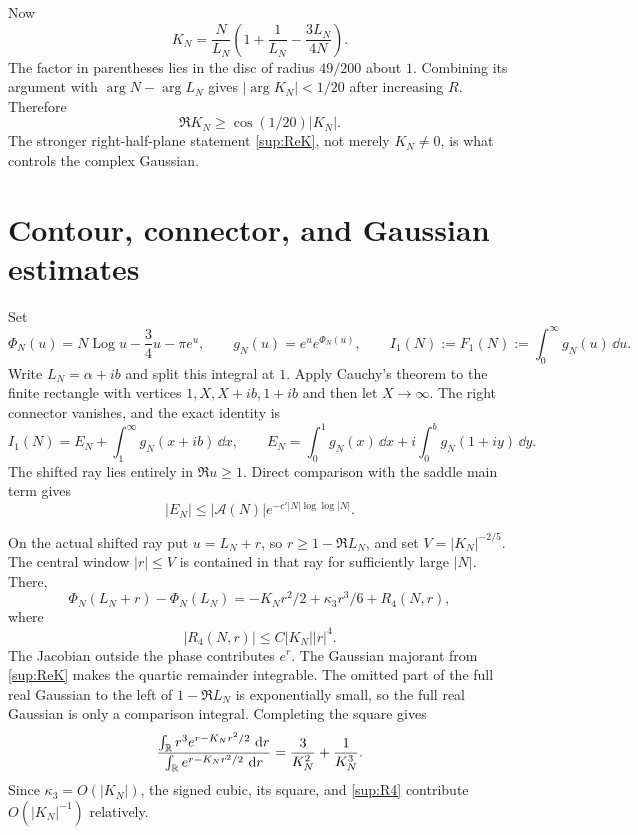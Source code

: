 \documentclass[10pt]{article}
\begin{document}
Now
\[
 K_N=\frac{N}{L_N}\left(1+\frac1{L_N}-\frac{3L_N}{4N}\right).
\]
The factor in parentheses lies in the disc of radius $49/200$ about $1$.
Combining its argument with $\arg N-\arg L_N$ gives
$|\arg K_N|<1/20$ after increasing $R$.  Therefore
\begin{equation}\label{sup:ReK}
 \Re K_N\ge\cos(1/20)|K_N|.
\end{equation}
The stronger right-half-plane statement \eqref{sup:ReK}, not merely
$K_N\ne0$, is what controls the complex Gaussian.

\section{Contour, connector, and Gaussian estimates}\label{sup:contour}

Set
\[
 \Phi_N(u)=N\operatorname{Log}u-\frac34u-\pi e^u,
 \qquad g_N(u)=e^u e^{\Phi_N(u)},
 \qquad I_1(N):=F_1(N):=\int_0^\infty g_N(u)\,\dd u.
\]
Write $L_N=\alpha+ib$ and split this integral at $1$.  Apply
Cauchy's theorem to the finite rectangle with vertices
$1,X,X+ib,1+ib$ and then let $X\to\infty$.  The right connector vanishes,
and the exact identity is
\begin{equation}\label{sup:legal-contour}
 I_1(N)=E_N+\int_1^\infty g_N(x+ib)\,\dd x,
 \qquad
 E_N=\int_0^1g_N(x)\,\dd x+i\int_0^b g_N(1+iy)\,\dd y.
\end{equation}
The shifted ray lies entirely in $\Re u\ge1$.  Direct comparison with the
saddle main term gives
\begin{equation}\label{sup:connector-bound}
 |E_N|\le |\mathcal A(N)|e^{-c'|N|\log\log|N|}.
\end{equation}

On the actual shifted ray put $u=L_N+r$, so $r\ge1-\Re L_N$, and set
$V=|K_N|^{-2/5}$.  The central window $|r|\le V$ is contained in that ray
for sufficiently large $|N|$.  There,
\begin{equation}\label{sup:central-expansion}
 \Phi_N(L_N+r)-\Phi_N(L_N)
 =-K_Nr^2/2+\kappa_3r^3/6+R_4(N,r),
\end{equation}
where
\begin{equation}\label{sup:R4}
 |R_4(N,r)|\le C|K_N||r|^4.
\end{equation}
The Jacobian outside the phase contributes $e^r$.  The Gaussian majorant from
\eqref{sup:ReK} makes the quartic remainder integrable.  The omitted part of
the full real Gaussian to the left of $1-\Re L_N$ is exponentially small, so
the full real Gaussian is only a comparison integral.  Completing the square
gives
\[
 \frac{\int_{\mathbb R}r^3e^{r-K_Nr^2/2}\,\,\mathrm d r}
 {\int_{\mathbb R}e^{r-K_Nr^2/2}\,\,\mathrm d r}
 =\frac3{K_N^2}+\frac1{K_N^3}.
\]
Since $\kappa_3=O(|K_N|)$, the signed cubic, its square, and
\eqref{sup:R4} contribute $O(|K_N|^{-1})$ relatively.
\end{document}

